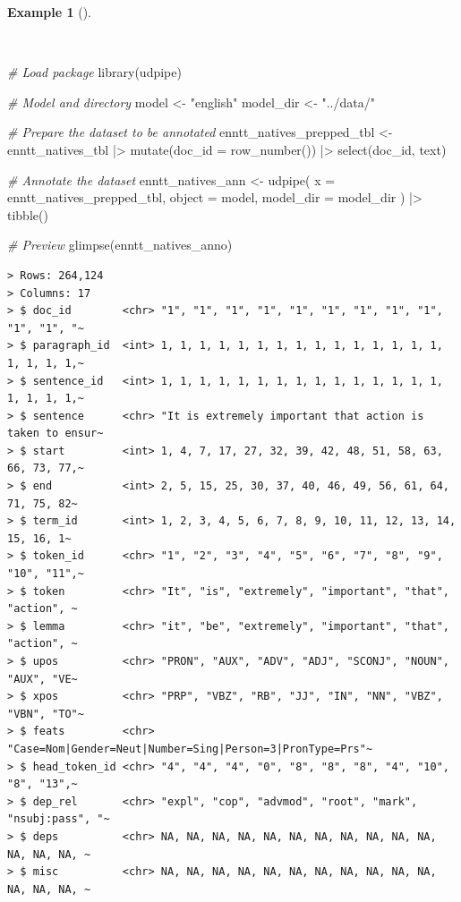 \documentclass[
  letterpaper,
  DIV=11,
  numbers=noendperiod]{scrreport}
\newenvironment{Shaded}{\begin{snugshade}}{\end{snugshade}}
\newcommand{\AttributeTok}[1]{\textcolor[rgb]{0.00,0.00,0.00}{#1}}
\newcommand{\CommentTok}[1]{\textcolor[rgb]{0.00,0.00,0.00}{\textit{#1}}}
\newcommand{\FunctionTok}[1]{\textcolor[rgb]{0.00,0.00,0.00}{#1}}
\newcommand{\NormalTok}[1]{\textcolor[rgb]{0.00,0.00,0.00}{#1}}
\newcommand{\OtherTok}[1]{\textcolor[rgb]{0.00,0.00,0.00}{#1}}
\newcommand{\SpecialCharTok}[1]{\textcolor[rgb]{0.00,0.00,0.00}{#1}}
\newcommand{\StringTok}[1]{\textcolor[rgb]{0.00,0.00,0.00}{#1}}
\theoremstyle{definition}
\newtheorem{example}{Example}[chapter]
\theoremstyle{remark}
\begin{document}
\begin{example}[]\protect\hypertarget{exm-td-generation-udpipe-natives}{}\label{exm-td-generation-udpipe-natives}

~

\begin{Shaded}
\begin{Highlighting}[]
\CommentTok{\# Load package}
\FunctionTok{library}\NormalTok{(udpipe)}

\CommentTok{\# Model and directory}
\NormalTok{model }\OtherTok{\textless{}{-}} \StringTok{"english"}
\NormalTok{model\_dir }\OtherTok{\textless{}{-}} \StringTok{"../data/"}

\CommentTok{\# Prepare the dataset to be annotated}
\NormalTok{enntt\_natives\_prepped\_tbl }\OtherTok{\textless{}{-}} 
\NormalTok{  enntt\_natives\_tbl }\SpecialCharTok{|\textgreater{}}
  \FunctionTok{mutate}\NormalTok{(}\AttributeTok{doc\_id =} \FunctionTok{row\_number}\NormalTok{()) }\SpecialCharTok{|\textgreater{}}
  \FunctionTok{select}\NormalTok{(doc\_id, text)}

\CommentTok{\# Annotate the dataset}
\NormalTok{enntt\_natives\_ann }\OtherTok{\textless{}{-}} 
  \FunctionTok{udpipe}\NormalTok{(}
    \AttributeTok{x =}\NormalTok{ enntt\_natives\_prepped\_tbl, }
    \AttributeTok{object =}\NormalTok{ model, }
    \AttributeTok{model\_dir =}\NormalTok{ model\_dir}
\NormalTok{  ) }\SpecialCharTok{|\textgreater{}} 
  \FunctionTok{tibble}\NormalTok{()}

\CommentTok{\# Preview }
\FunctionTok{glimpse}\NormalTok{(enntt\_natives\_anno)}
\end{Highlighting}
\end{Shaded}

\begin{verbatim}
> Rows: 264,124
> Columns: 17
> $ doc_id        <chr> "1", "1", "1", "1", "1", "1", "1", "1", "1", "1", "1", "~
> $ paragraph_id  <int> 1, 1, 1, 1, 1, 1, 1, 1, 1, 1, 1, 1, 1, 1, 1, 1, 1, 1, 1,~
> $ sentence_id   <int> 1, 1, 1, 1, 1, 1, 1, 1, 1, 1, 1, 1, 1, 1, 1, 1, 1, 1, 1,~
> $ sentence      <chr> "It is extremely important that action is taken to ensur~
> $ start         <int> 1, 4, 7, 17, 27, 32, 39, 42, 48, 51, 58, 63, 66, 73, 77,~
> $ end           <int> 2, 5, 15, 25, 30, 37, 40, 46, 49, 56, 61, 64, 71, 75, 82~
> $ term_id       <int> 1, 2, 3, 4, 5, 6, 7, 8, 9, 10, 11, 12, 13, 14, 15, 16, 1~
> $ token_id      <chr> "1", "2", "3", "4", "5", "6", "7", "8", "9", "10", "11",~
> $ token         <chr> "It", "is", "extremely", "important", "that", "action", ~
> $ lemma         <chr> "it", "be", "extremely", "important", "that", "action", ~
> $ upos          <chr> "PRON", "AUX", "ADV", "ADJ", "SCONJ", "NOUN", "AUX", "VE~
> $ xpos          <chr> "PRP", "VBZ", "RB", "JJ", "IN", "NN", "VBZ", "VBN", "TO"~
> $ feats         <chr> "Case=Nom|Gender=Neut|Number=Sing|Person=3|PronType=Prs"~
> $ head_token_id <chr> "4", "4", "4", "0", "8", "8", "8", "4", "10", "8", "13",~
> $ dep_rel       <chr> "expl", "cop", "advmod", "root", "mark", "nsubj:pass", "~
> $ deps          <chr> NA, NA, NA, NA, NA, NA, NA, NA, NA, NA, NA, NA, NA, NA, ~
> $ misc          <chr> NA, NA, NA, NA, NA, NA, NA, NA, NA, NA, NA, NA, NA, NA, ~
\end{verbatim}


\end{example}
\end{document}
